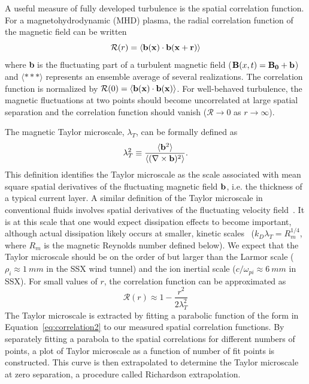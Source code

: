 \documentclass[aps,prl,amsmath,amssymb,reprint,superscriptaddress]{revtex4-1} %
\begin{document}
A useful measure of fully developed turbulence is the spatial correlation function.  For a magnetohydrodynamic (MHD) plasma, the radial correlation function of the magnetic field can be written
%
\begin{equation}
\mathcal{R}(r) =  \langle {\bf b(x) \cdot b(x + r)} \rangle
\label{eq:correlation1}
\end{equation}
%
where {\bf b} is the fluctuating part of a turbulent magnetic field (${\bf B}(x, t) = {\bf B_0 + b}$) and $ \langle*** \rangle$ represents an ensemble average of several realizations.  The correlation function is normalized by $\mathcal{R}(0) =  \langle {\bf b(x) \cdot b(x)} \rangle$.  For well-behaved turbulence, the magnetic fluctuations at two points should become uncorrelated at large spatial separation and the correlation function should vanish ($\mathcal{R} \rightarrow 0$ as $r \rightarrow \infty$).  

The magnetic Taylor microscale, $\lambda_{T}$, can be formally defined as
%
\begin{equation}
\lambda_T^2 \equiv \frac{\langle {\bf b}^2 \rangle}{\langle (\nabla \times {\bf b})^2 \rangle}.
\label{eq:tayscale}
\end{equation}
%
This definition identifies the Taylor microscale as the scale associated with mean square spatial derivatives of the fluctuating magnetic field $\bf{b}$, i.e. the thickness of a typical current layer. A similar definition of the Taylor microscale in conventional fluids involves spatial derivatives of the fluctuating velocity field~\cite{frisch95}. It is at this scale that one would expect dissipation effects to become important, although actual dissipation likely occurs at smaller, kinetic scales~\cite{Matthaeus08} ($k_D \lambda_T = R_m^{1/4}$, where $R_m$ is the magnetic Reynolds number defined below).  We expect that the Taylor microscale should be on the order of but larger than the Larmor scale ($\rho_i \approx 1~mm$ in the SSX wind tunnel) and the ion inertial scale ($c/\omega_{pi} \approx 6~mm$ in SSX). For small values of $r$, the correlation function can be approximated as
%
\begin{equation}
\mathcal{R}(r) \approx  1 - \frac{r^2}{2 \lambda_T^2} 
\label{eq:correlation2} 
\end{equation}
%
The Taylor microscale is extracted by fitting a parabolic function of the form in Equation~\ref{eq:correlation2} to our measured spatial correlation functions. By separately fitting a parabola to the spatial correlations for different numbers of points, a plot of Taylor microscale as a function of number of fit points is constructed. This curve is then extrapolated to determine the Taylor microscale at zero separation, a procedure called Richardson extrapolation. 
\end{document}
